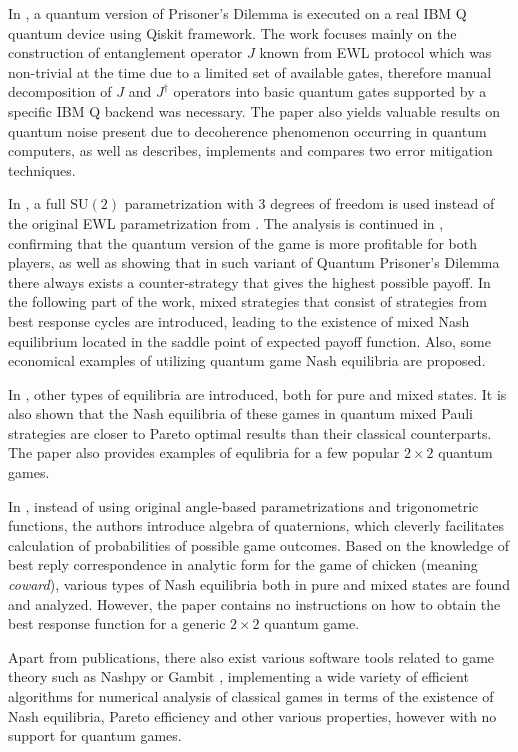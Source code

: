 \documentclass[../main.tex]{subfiles}
\begin{document}
In \cite{galas2019quantum}, a quantum version of Prisoner's Dilemma is executed on a real IBM Q quantum device using Qiskit framework. The work focuses mainly on the construction of entanglement operator $J$ known from EWL protocol which was non-trivial at the time due to a limited set of available gates, therefore manual decomposition of $J$ and $J^\dag$ operators into basic quantum gates supported by a specific IBM Q backend was necessary. The paper also yields valuable results on quantum noise present due to decoherence phenomenon occurring in quantum computers, as well as describes, implements and compares two error mitigation techniques.

In \cite{chen2006well}, a full $\text{SU}(2)$ parametrization with 3 degrees of freedom is used instead of the original EWL parametrization from \cite{eisert1999quantum}. The analysis is continued in \cite{Szopa_2014}, confirming that the quantum version of the game is more profitable for both players, as well as showing that in such variant of Quantum Prisoner's Dilemma there always exists a counter-strategy that gives the highest possible payoff. In the following part of the work, mixed strategies that consist of strategies from best response cycles are introduced, leading to the existence of mixed Nash equilibrium located in the saddle point of expected payoff function. Also, some economical examples of utilizing quantum game Nash equilibria are proposed.

In \cite{szopa2021efficiency}, other types of equilibria are introduced, both for pure and mixed states. It is also shown that the Nash equilibria of these games in quantum mixed Pauli strategies are closer to Pareto optimal results than their classical counterparts. The paper also provides examples of equlibria for a few popular $2 \times 2$ quantum games.

In \cite{shaik2014best}, instead of using original angle-based parametrizations and trigonometric functions, the authors introduce algebra of quaternions, which cleverly facilitates calculation of probabilities of possible game outcomes. Based on the knowledge of best reply correspondence in analytic form for the game of chicken (meaning \emph{coward}), various types of Nash equilibria both in pure and mixed states are found and analyzed. However, the paper contains no instructions on how to obtain the best response function for a generic $2 \times 2$ quantum game.

Apart from publications, there also exist various software tools related to game theory such as Nashpy \cite{nashpyproject} or Gambit \cite{mckelvey2006gambit}, implementing a wide variety of  efficient algorithms for numerical analysis of classical games in terms of the existence of Nash equilibria, Pareto efficiency and other various properties, however with no support for quantum games.
\end{document}
